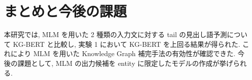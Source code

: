 \documentclass[a4paper,twoside,twocolumn,10pt]{article}
\begin{document}

\section{まとめと今後の課題}

本研究では, MLM を用いた 2 種類の入力文に対する tail の見出し語予測について KG-BERT と比較し, 実験 1 において KG-BERT を上回る結果が得られた. これにより MLM を用いた Knowledge Graph 補完手法の有効性が確認できた. 今後の課題として, MLM の出力候補を entity に限定したモデルの作成が挙げられる. 



\end{document}
